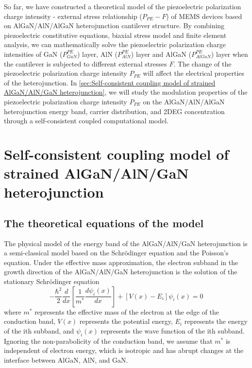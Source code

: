 So far, we have constructed a theoretical model of the  piezoelectric polarization charge intensity - external stress relationship ($P_{PE} - F$) of  MEMS devices based on AlGaN/AlN/AlGaN  heterojunction cantilever  structure. By combining piezoelectric constitutive  equations, biaxial stress model  and  finite element analysis, we can mathematically solve the piezoelectric polarization charge intensities of GaN ($P_{GaN}^{PE}$) layer, AlN ($P_{AlN}^{PE}$) layer and AlGaN ($P_{AlGaN}^{PE}$) layer when the cantilever is subjected to different external stresses $F$. The change of the piezoelectric polarization charge intensity $P_{PE}$ will affect the electrical properties of the heterojunction. In \autoref{sec:Self-consistent coupling model of strained AlGaN/AlN/GaN heterojunction}, we will study the modulation  properties of the piezoelectric polarization charge intensity $P_{PE}$ on the AlGaN/AlN/AlGaN heterojunction energy  band, carrier  distribution, and 2DEG concentration  through a self-consistent coupled computational  model.

\section{Self-consistent coupling model of strained AlGaN/AlN/GaN heterojunction}
\label{sec:Self-consistent coupling model of strained AlGaN/AlN/GaN heterojunction}

\subsection{The theoretical equations of the model}
\label{sec:The theoretical equations of the model}

The physical model of the energy band  of the  AlGaN/AlN/GaN heterojunction is a semi-classical model based on the Schrödinger equation  and the  Poisson's equation. Under the effective mass approximation, the electron subband in the growth direction of the AlGaN/AlN/GaN heterojunction is the solution of the stationary Schrödinger equation \cite{lenka2011self}
\begin{equation}
-\frac{\hbar^{2}}{2} \frac{d}{d x}\left[\frac{1}{m^{*}} \frac{d \psi_{i}(x)}{d x}\right]+\left[V(x)-E_{i}\right] \psi_{i}(x)=0
\label{eq:2.19}
\end{equation}
where $m^{*}$ represents the effective mass of the electron at the edge of the conduction  band, $V(x)$ represents the potential energy, $E_{i}$ represents the energy of the ith subband, and $\psi_{i}(x)$ represents the wave function of the ith subband. Ignoring the non-parabolicity of the conduction band, we assume that  $m^{*}$ is independent of electron energy, which is isotropic and has abrupt changes at the interface  between AlGaN, AlN, and GaN.

